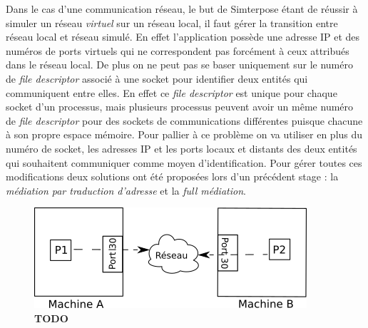 Dans le cas d'une communication réseau, le but de Simterpose étant de réussir à
simuler un réseau \textit{virtuel} sur un réseau local, il faut gérer la
transition entre réseau local et réseau simulé. En effet l'application possède
une adresse IP et des numéros de ports virtuels qui ne correspondent pas
forcément à ceux attribués dans le réseau local. De plus on ne peut pas se baser
uniquement sur le numéro de \textit{file descriptor} associé à une socket pour
identifier deux entités qui communiquent entre elles. En effet ce \textit{file
  descriptor} est unique pour chaque socket d'un processus, mais plusieurs
processus peuvent avoir un même numéro de \textit{file descriptor} pour des
sockets de communications différentes puisque chacune à son propre espace
mémoire. Pour pallier à ce problème on va utiliser en plus du numéro de socket,
les adresses IP et les ports locaux et distants des deux entités qui souhaitent
communiquer comme moyen d'identification. Pour gérer toutes ces modifications
deux solutions ont été proposées lors d'un précédent stage
\citep{GUILLAUME:Interceptionsyscall}: la \textit{médiation par traduction
  d'adresse} et la \textit{full médiation}.

\begin{figure}
  \centering
  \includegraphics[scale=0.5]{Pictures/png/Mediation_realite}
  \caption{{\color{red} \textbf{TODO}}}
  \label{COMM_REALITE}
\end{figure}

